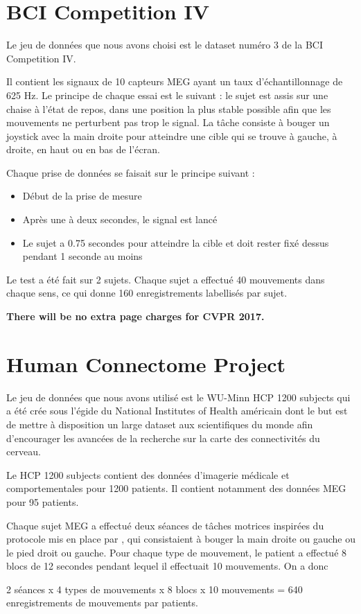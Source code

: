 \documentclass[10pt,twocolumn,letterpaper]{article}
\begin{document}
\section{BCI Competition IV}
Le jeu de données que nous avons choisi est le dataset numéro 3 de la BCI Competition IV.

Il contient les signaux de 10 capteurs MEG ayant un taux d'échantillonnage de 625 Hz.
Le principe de chaque essai est le suivant : le sujet est assis sur une chaise à l'état de repos, dans une position la plus stable possible afin que les mouvements ne perturbent pas trop le signal. La tâche consiste à bouger un joystick avec la main droite pour atteindre une cible qui se trouve à gauche, à droite, en haut ou en bas de l'écran.

Chaque prise de données se faisait sur le principe suivant :
\begin{itemize}
	\item Début de la prise de mesure
	\item Après une à deux secondes, le signal est lancé
	\item Le sujet a 0.75 secondes pour atteindre la cible et doit rester fixé dessus pendant 1 seconde au moins
\end{itemize}

Le test a été fait sur 2 sujets.
Chaque sujet a effectué 40 mouvements dans chaque sens, ce qui donne 160 enregistrements labellisés par sujet.

{\bf There will be no extra page charges for
  CVPR 2017.}


\section{Human Connectome Project}
Le jeu de données que nous avons utilisé est le WU-Minn HCP 1200 subjects qui a été crée sous l'égide du National Institutes of Health américain dont le but est de mettre à disposition un large dataset aux scientifiques du monde afin d'encourager les avancées de la recherche sur la carte des connectivités du cerveau.

Le HCP 1200 subjects \cite{HCPmanual} contient des données d'imagerie médicale et comportementales pour 1200 patients.
Il contient notamment des données MEG pour 95 patients.

Chaque sujet MEG a effectué deux séances de tâches motrices inspirées du protocole mis en place par \cite{Buckner}, qui consistaient à bouger la main droite ou gauche ou le pied droit ou gauche.
Pour chaque type de mouvement, le patient a effectué 8 blocs de 12 secondes pendant lequel il effectuait 10 mouvements. On a donc 
\begin{center}
	2 séances x 4 types de mouvements x 8 blocs x 10 mouvements = 640 enregistrements de mouvements par patients.
\end{center}
\end{document}
